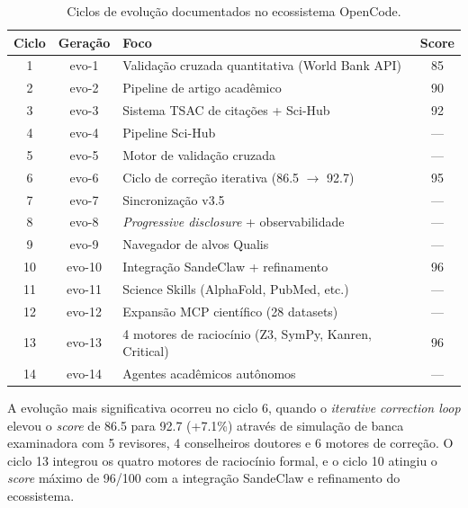 \documentclass[
  article,
  12pt,
  oneside,
  a4paper,
  brazil,
  sumario=tradicional
]{abntex2}
\begin{document}
\begin{table}[H]
  \centering
  \caption{Ciclos de evolução documentados no ecossistema OpenCode.}
  \label{tab:evociclos}
  \begin{tabular}{|c|c|l|c|}
    \hline
    \textbf{Ciclo} & \textbf{Geração} & \textbf{Foco} & \textbf{Score} \\
    \hline
    1  & evo-1  & Validação cruzada quantitativa (World Bank API) & 85 \\
    2  & evo-2  & Pipeline de artigo acadêmico & 90 \\
    3  & evo-3  & Sistema TSAC de citações + Sci-Hub & 92 \\
    4  & evo-4  & Pipeline Sci-Hub & --- \\
    5  & evo-5  & Motor de validação cruzada & --- \\
    6  & evo-6  & Ciclo de correção iterativa (86.5 $\rightarrow$ 92.7) & 95 \\
    7  & evo-7  & Sincronização v3.5 & --- \\
    8  & evo-8  & \emph{Progressive disclosure} + observabilidade & --- \\
    9  & evo-9  & Navegador de alvos Qualis & --- \\
    10 & evo-10 & Integração SandeClaw + refinamento & 96 \\
    11 & evo-11 & Science Skills (AlphaFold, PubMed, etc.) & --- \\
    12 & evo-12 & Expansão MCP científico (28 datasets) & --- \\
    13 & evo-13 & 4 motores de raciocínio (Z3, SymPy, Kanren, Critical) & 96 \\
    14 & evo-14 & Agentes acadêmicos autônomos & --- \\
    \hline
  \end{tabular}
\end{table}

A evolução mais significativa ocorreu no ciclo 6, quando o \emph{iterative correction loop} elevou o \emph{score} de 86.5 para 92.7 (+7.1\%) através de simulação de banca examinadora com 5 revisores, 4 conselheiros doutores e 6 motores de correção. O ciclo 13 integrou os quatro motores de raciocínio formal, e o ciclo 10 atingiu o \emph{score} máximo de 96/100 com a integração SandeClaw e refinamento do ecossistema.
\end{document}
